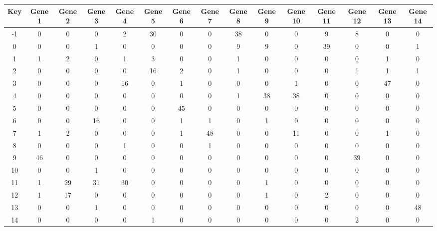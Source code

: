 \begin{tabular}{|c|c|c|c|c|c|c|c|c|c|c|c|c|c|c|}
\hline
Key & Gene 1 & Gene 2 & Gene 3 & Gene 4 & Gene 5 & Gene 6 & Gene 7 & Gene 8 & Gene 9 & Gene 10 & Gene 11 & Gene 12 & Gene 13 & Gene 14 \\
\hline
-1 & 0 & 0 & 0 & 2 & 30 & 0 & 0 & 38 & 0 & 0 & 9 & 8 & 0 & 0 \\
0 & 0 & 0 & 1 & 0 & 0 & 0 & 0 & 9 & 9 & 0 & 39 & 0 & 0 & 1 \\
1 & 1 & 2 & 0 & 1 & 3 & 0 & 0 & 1 & 0 & 0 & 0 & 0 & 1 & 0 \\
2 & 0 & 0 & 0 & 0 & 16 & 2 & 0 & 1 & 0 & 0 & 0 & 1 & 1 & 1 \\
3 & 0 & 0 & 0 & 16 & 0 & 1 & 0 & 0 & 0 & 1 & 0 & 0 & 47 & 0 \\
4 & 0 & 0 & 0 & 0 & 0 & 0 & 0 & 1 & 38 & 38 & 0 & 0 & 0 & 0 \\
5 & 0 & 0 & 0 & 0 & 0 & 45 & 0 & 0 & 0 & 0 & 0 & 0 & 0 & 0 \\
6 & 0 & 0 & 16 & 0 & 0 & 1 & 1 & 0 & 1 & 0 & 0 & 0 & 0 & 0 \\
7 & 1 & 2 & 0 & 0 & 0 & 1 & 48 & 0 & 0 & 11 & 0 & 0 & 1 & 0 \\
8 & 0 & 0 & 0 & 1 & 0 & 0 & 1 & 0 & 0 & 0 & 0 & 0 & 0 & 0 \\
9 & 46 & 0 & 0 & 0 & 0 & 0 & 0 & 0 & 0 & 0 & 0 & 39 & 0 & 0 \\
10 & 0 & 0 & 1 & 0 & 0 & 0 & 0 & 0 & 0 & 0 & 0 & 0 & 0 & 0 \\
11 & 1 & 29 & 31 & 30 & 0 & 0 & 0 & 0 & 1 & 0 & 0 & 0 & 0 & 0 \\
12 & 1 & 17 & 0 & 0 & 0 & 0 & 0 & 0 & 1 & 0 & 2 & 0 & 0 & 0 \\
13 & 0 & 0 & 1 & 0 & 0 & 0 & 0 & 0 & 0 & 0 & 0 & 0 & 0 & 48 \\
14 & 0 & 0 & 0 & 0 & 1 & 0 & 0 & 0 & 0 & 0 & 0 & 2 & 0 & 0 \\
\hline
\end{tabular}
